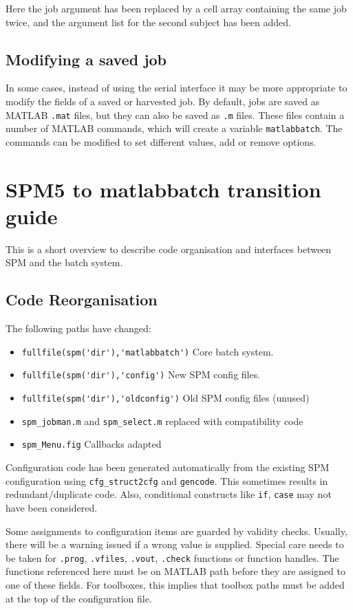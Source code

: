Here the job argument has been replaced by a cell array containing
the same job twice, and the argument list for the second subject has
been added.

\subsection{Modifying a saved job}

In some cases, instead of using the serial interface it may be more
appropriate to modify the fields of a saved or harvested job. By default, jobs
are saved as MATLAB \verb|.mat| files, but they can also be saved as
\verb|.m| files. These files contain a number of MATLAB commands,
which will create a variable \verb|matlabbatch|. The commands can be
modified to set different values, add or remove options. 
 
\section{SPM5 to matlabbatch transition guide}
\label{sec:overview}

This is a short overview to describe code organisation and interfaces between
SPM and the batch system.

\subsection{Code Reorganisation}
\label{sec:overcode}

The following paths have changed:
\begin{itemize}
\item \verb|fullfile(spm('dir'),'matlabbatch')| Core batch system.
\item \verb|fullfile(spm('dir'),'config')| New SPM config files.
\item \verb|fullfile(spm('dir'),'oldconfig')| Old SPM config files (unused)
\item \verb|spm_jobman.m| and \verb|spm_select.m| replaced with compatibility
  code
\item \verb|spm_Menu.fig| Callbacks adapted
\end{itemize}

Configuration code has been generated automatically from the existing SPM
configuration using \verb|cfg_struct2cfg| and \verb|gencode|. This sometimes
results in redundant/duplicate code. Also, conditional constructs like
\verb|if|, \verb|case| may not have been considered. 

Some assignments to configuration items are guarded by validity
checks. Usually, there will be a warning issued if a wrong value is
supplied. Special care needs to be taken for \verb|.prog|, \verb|.vfiles|,
\verb|.vout|, \verb|.check| functions or function handles. The functions
referenced here must be on MATLAB path before they are assigned to one of
these fields. For toolboxes, this implies that toolbox paths must be added at
the top of the configuration file.

